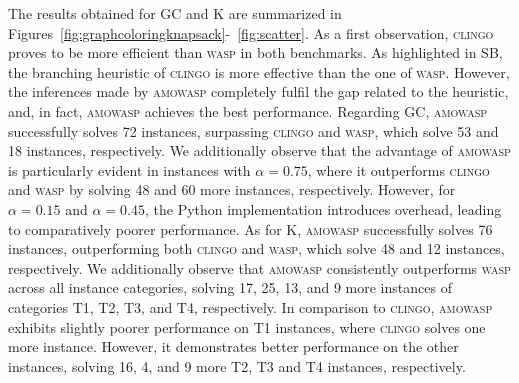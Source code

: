 The results obtained for GC and K are summarized in Figures~\ref{fig:graphcoloringknapsack}-~\ref{fig:scatter}.
As a first observation, \textsc{clingo} proves to be more efficient than \textsc{wasp} in both benchmarks.
As highlighted in SB, the branching heuristic of \textsc{clingo} is more effective than the one of \textsc{wasp}.
However, the inferences made by \textsc{amowasp} completely fulfil the gap related to the heuristic, and, in fact, \textsc{amowasp} achieves the best performance.
Regarding GC, \textsc{amowasp} successfully solves 72 instances, surpassing \textsc{clingo} and \textsc{wasp}, which solve 53 and 18 instances, respectively.
We additionally observe that the advantage of \textsc{amowasp} is particularly evident in instances with $\alpha = 0.75$, where it outperforms \textsc{clingo} and \textsc{wasp} by solving 48 and 60 more instances, respectively. However, for $\alpha = 0.15$ and $\alpha = 0.45$, the Python implementation introduces overhead, leading to comparatively poorer performance.
%
As for K, \textsc{amowasp} successfully solves 76 instances, outperforming both \textsc{clingo} and \textsc{wasp}, which solve 48 and 12 instances, respectively.
We additionally observe that \textsc{amowasp} consistently outperforms \textsc{wasp} across all instance categories,
solving 17, 25, 13, and 9 more instances of categories T1, T2, T3, and T4, respectively. 
In comparison to \textsc{clingo}, \textsc{amowasp} exhibits slightly poorer performance on T1 
instances, where \textsc{clingo} solves one more instance. However, 
it demonstrates better performance on the other instances, solving 16, 4, and 9 more T2, T3 and T4 instances, respectively.

